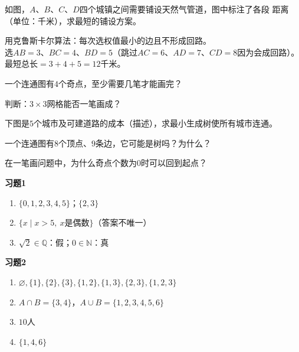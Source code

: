 \documentclass[a4paper,12pt]{ctexart}
\begin{document}


\begin{example}
如图，$A$、$B$、$C$、$D$四个城镇之间需要铺设天然气管道，图中标注了各段
距离（单位：千米），求最短的铺设方案。
\end{example}
\begin{solution}
用克鲁斯卡尔算法：每次选权值最小的边且不形成回路。\\
选$AB=3$、$BC=4$、$BD=5$（跳过$AC=6$、$AD=7$、$CD=8$因为会成回路）。\\
最短总长$=3+4+5=12$千米。
\end{solution}


\begin{exercise}
\item 一个连通图有$4$个奇点，至少需要几笔才能画完？
\item 判断：$3\times3$网格能否一笔画成？
\item 下图是$5$个城市及可建道路的成本（描述），求最小生成树使所有城市连通。
\item 一个连通图有$8$个顶点、$9$条边，它可能是树吗？为什么？
\item 在一笔画问题中，为什么奇点个数为$0$时可以回到起点？
\end{exercise}

\newpage
{}

\textbf{习题1}
\begin{enumerate}
\item $\{0,1,2,3,4,5\}$；$\{2,3\}$
\item $\{x\mid x>5,\ x\text{是偶数}\}$（答案不唯一）
\item $\sqrt2\in\mathbb Q$：假；$0\in\mathbb N$：真
\end{enumerate}

\textbf{习题2}
\begin{enumerate}
\item $\varnothing,\{1\},\{2\},\{3\},\{1,2\},\{1,3\},\{2,3\},\{1,2,3\}$
\item $A\cap B=\{3,4\}$，$A\cup B=\{1,2,3,4,5,6\}$
\item $10$人
\item $\{1,4,6\}$
\end{enumerate}
\end{document}
